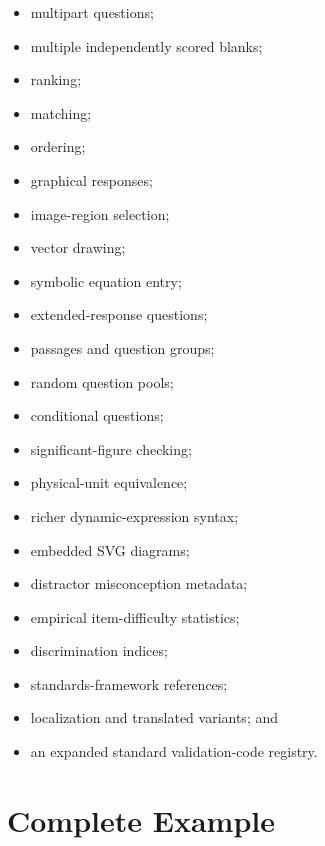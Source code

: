 \documentclass[11pt]{article}
\begin{document}
	\begin{itemize}
		\item multipart questions;
		\item multiple independently scored blanks;
		\item ranking;
		\item matching;
		\item ordering;
		\item graphical responses;
		\item image-region selection;
		\item vector drawing;
		\item symbolic equation entry;
		\item extended-response questions;
		\item passages and question groups;
		\item random question pools;
		\item conditional questions;
		\item significant-figure checking;
		\item physical-unit equivalence;
		\item richer dynamic-expression syntax;
		\item embedded SVG diagrams;
		\item distractor misconception metadata;
		\item empirical item-difficulty statistics;
		\item discrimination indices;
		\item standards-framework references;
		\item localization and translated variants; and
		\item an expanded standard validation-code registry.
	\end{itemize}
	
	\section{Complete Example}
	
\end{document}
